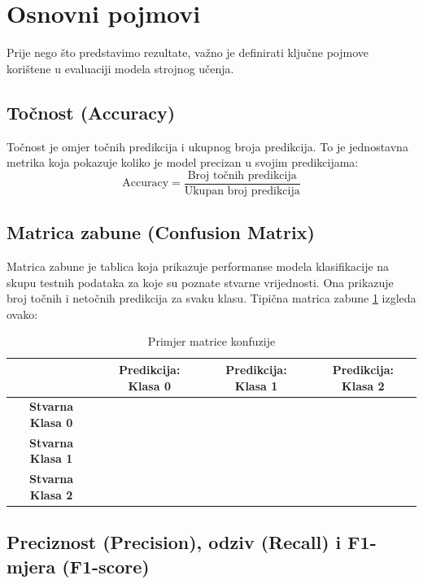 \documentclass[zavrsnirad]{fer}
\begin{document}
\section{Osnovni pojmovi}

Prije nego što predstavimo rezultate, važno je definirati ključne pojmove korištene u evaluaciji modela strojnog učenja.

\subsection{Točnost (Accuracy)}

Točnost je omjer točnih predikcija i ukupnog broja predikcija. To je jednostavna metrika koja pokazuje koliko je model precizan u svojim predikcijama:
\begin{equation}
	\text{Accuracy} = \frac{\text{Broj točnih predikcija}}{\text{Ukupan broj predikcija}}
\end{equation}

\subsection{Matrica zabune (Confusion Matrix)}

Matrica zabune je tablica koja prikazuje performanse modela klasifikacije na skupu testnih podataka za koje su poznate stvarne vrijednosti. Ona prikazuje broj točnih i netočnih predikcija za svaku klasu. Tipična matrica zabune \ref{tab:conf_matrix} izgleda ovako:

\begin{table}[h]
	\centering
	\begin{tabular}{c|c|c|c}
		& \textbf{Predikcija: Klasa 0} & \textbf{Predikcija: Klasa 1} & \textbf{Predikcija: Klasa 2} \\ \hline
		\textbf{Stvarna Klasa 0} & \cellcolor{green!25} & & \\ \hline
		\textbf{Stvarna Klasa 1} & & \cellcolor{green!25} & \\ \hline
		\textbf{Stvarna Klasa 2} & & & \cellcolor{green!25} \\ 
	\end{tabular}
	\caption{Primjer matrice konfuzije}
	\label{tab:conf_matrix}
\end{table}

\subsection{Preciznost (Precision), odziv (Recall) i F1-mjera (F1-score)}
\end{document}
